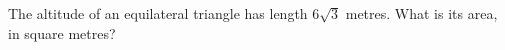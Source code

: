 The altitude of an equilateral triangle has length $6\sqrt3$ metres. What is its area, in square metres?
